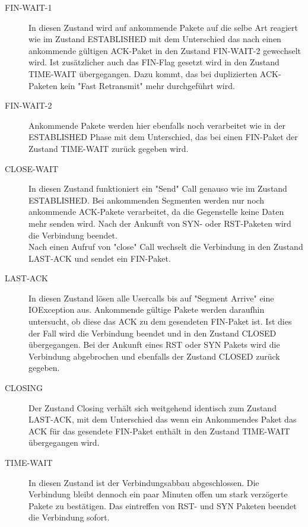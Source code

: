 \begin{description}
\item[FIN-WAIT-1]

In diesen Zustand wird auf ankommende Pakete auf die selbe Art reagiert wie im Zustand ESTABLISHED mit dem Unterschied das nach einen ankommende gültigen ACK-Paket in den Zustand FIN-WAIT-2 gewechselt wird. Ist zusätzlicher auch das FIN-Flag gesetzt wird in den Zustand TIME-WAIT übergegangen. Dazu kommt, das bei duplizierten ACK-Paketen kein {}"Fast Retransmit"{} mehr durchgeführt wird.

\item[FIN-WAIT-2]	
Ankommende Pakete werden hier ebenfalls noch verarbeitet wie in der ESTABLISHED Phase mit dem Unterschied, das bei einen FIN-Paket der Zustand TIME-WAIT zurück gegeben wird.


\item[CLOSE-WAIT]

In diesen Zustand funktioniert ein "{}Send"{} Call genauso wie im Zustand ESTABLISHED. Bei ankommenden Segmenten werden nur noch ankommende ACK-Pakete verarbeitet, da die Gegenstelle keine Daten mehr senden wird. Nach der Ankunft von SYN- oder RST-Paketen wird die Verbindung beendet. \\
Nach einen Aufruf von {}"close"{} Call wechselt die Verbindung in den Zustand LAST-ACK und sendet ein FIN-Paket.

\item[LAST-ACK]

In diesen Zustand lösen alle Usercalls bis auf {}"Segment Arrive"{} eine IOException aus. Ankommende gültige Pakete werden daraufhin untersucht, ob diese das ACK zu dem gesendeten FIN-Paket ist. Ist dies der Fall wird die Verbindung beendet und in den Zustand CLOSED übergegangen. Bei der Ankunft eines RST oder SYN Pakets wird die Verbindung abgebrochen und ebenfalls der Zustand CLOSED zurück gegeben.

\item[CLOSING]

Der Zustand Closing verhält sich weitgehend identisch zum Zustand LAST-ACK, mit dem Unterschied das wenn ein Ankommendes Paket das ACK für das gesendete FIN-Paket enthält in den Zustand TIME-WAIT übergegangen wird.


\item[TIME-WAIT]
In diesen Zustand ist der Verbindungsabbau abgeschlossen. Die Verbindung bleibt dennoch ein paar Minuten offen um stark verzögerte Pakete zu bestätigen. Das eintreffen von RST- und SYN Paketen beendet die Verbindung sofort.

\end{description}

